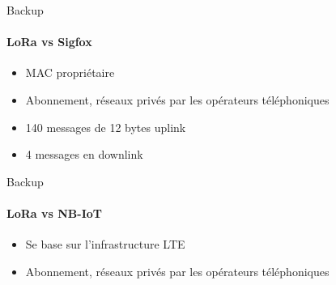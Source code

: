 \begin{frame}{Backup}
\framesubtitle{LoRa vs Sigfox}
\begin{itemize}
  \item MAC propriétaire
  \item Abonnement, réseaux privés par les opérateurs téléphoniques
  \item 140 messages de 12 bytes uplink
  \item 4 messages en downlink
\end{itemize}
\end{frame}

\begin{frame}{Backup}
\framesubtitle{LoRa vs NB-IoT}
\begin{itemize}
  \item Se base sur l'infrastructure LTE
  \item Abonnement, réseaux privés par les opérateurs téléphoniques
\end{itemize}
\end{frame}

